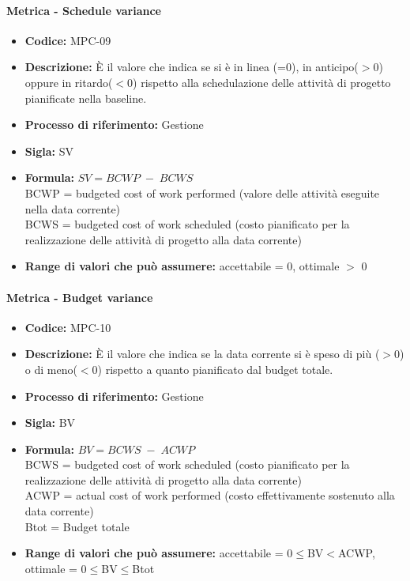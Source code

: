     \paragraph{Metrica - Schedule variance}
    \begin{itemize}
        \item \textbf{Codice:} MPC-09
        \item \textbf{Descrizione:} È il valore che indica se si è in linea (=0), in anticipo($>$0) oppure in ritardo($<$0) rispetto alla schedulazione delle attività di progetto pianificate nella baseline.
        \item \textbf{Processo di riferimento:} Gestione
        \item \textbf{Sigla:} SV
        \item \textbf{Formula:} \begin{math}{SV = {BCWP \; - \; BCWS}}\end{math} \\BCWP = budgeted cost of work performed (valore delle attività eseguite nella data corrente) \\BCWS = budgeted cost of work scheduled (costo pianificato per la realizzazione delle attività di progetto alla data corrente)
        \item \textbf{Range di valori che può assumere:} accettabile = 0, ottimale $>$ 0
    \end{itemize}

    \paragraph{Metrica - Budget variance}
        \begin{itemize}
            \item \textbf{Codice:} MPC-10 
            \item \textbf{Descrizione:} È il valore che indica se la data corrente si è speso di più ($>$0) o di meno($<$0) rispetto a quanto pianificato dal budget totale.
            \item \textbf{Processo di riferimento:} Gestione
            \item \textbf{Sigla:} BV
            \item \textbf{Formula:} \begin{math}{BV = {BCWS \; - \; ACWP}}\end{math} \\BCWS = budgeted cost of work scheduled (costo pianificato per la realizzazione delle attività di progetto alla data corrente) \\ACWP = actual cost of work performed (costo effettivamente sostenuto alla data corrente) \\Btot = Budget totale
            \item \textbf{Range di valori che può assumere:} accettabile = 0$\leq$BV$<$ACWP, ottimale = 0$\leq$BV$\leq$Btot
        \end{itemize}

